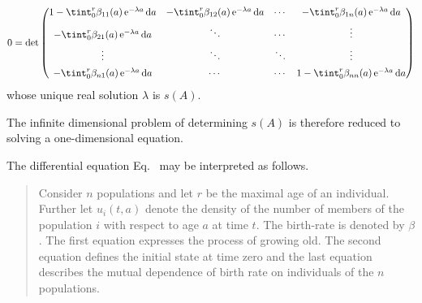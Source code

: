 \begin{example}
%
\[
0 = \det
\begin{pmatrix}
 1 - \tint_{0}^{r}\beta_{11}(a)\,\eu^{-\lambda a}\diff{a}
   & -\tint_{0}^{r}\beta_{12}(a)\,\eu^{-\lambda a}\diff{a}
   & \cdots
   & -\tint_{0}^{r}\beta_{1n}(a)\,\eu^{-\lambda a}\diff{a} \\[1ex]
  -\tint_{0}^{r}\beta_{21}(a)\,\eu^{-\lambda a}\diff{a}
   & \ddots & \cdots & \vdots \\[1ex]
   \vdots & \ddots & \ddots & \vdots \\[1ex]
  -\tint_{0}^{r}\beta_{n1}(a)\,\eu^{-\lambda a}\diff{a}
   & \cdots & \cdots
   & 1 - \tint_{0}^{r}\beta_{nn}(a)\,\eu^{-\lambda a}\diff{a}
\end{pmatrix}
\]
whose unique real solution $\lambda$ is $s(A)$.


The infinite dimensional problem of determining $s(A)$ is therefore reduced to solving a one-dimensional equation.
\end{example}
The differential equation Eq.~ may be interpreted as follows.
\begin{quote}
Consider $n$ populations and let $r$ be the maximal age of an individual.
Further let $u_{i}(t,a)$ denote the density of the number of members of the population $i$ with respect to age $a$ at time $t$.
The birth-rate is denoted by $\beta$.
The first equation expresses the process of growing old.
The second equation defines the initial state at time zero and the last equation describes the mutual dependence of birth rate on  individuals of the $n$ populations.
\end{quote}
